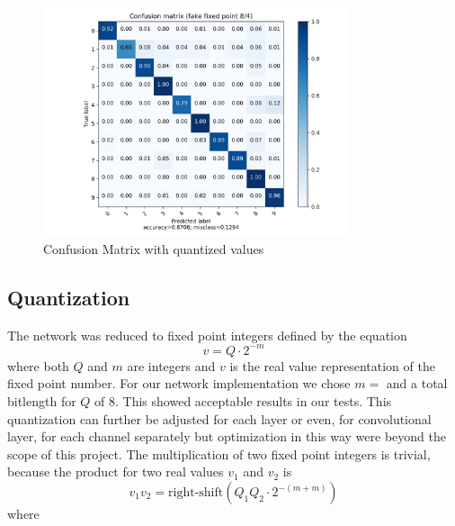 \begin{figure}[htbp]
	\centering
	\includegraphics[width=0.8\textwidth]{../../net/images/qcm}
	\caption{Confusion Matrix with quantized values}
	\label{fig:network-test-qcm}
\end{figure}

\subsection{Quantization}

The network was reduced to fixed point integers defined by the equation
\begin{equation}
	v = Q \cdot 2 ^{-m}
\end{equation}
where both $Q$ and $m$ are integers and $v$ is the real value representation of the fixed point number. 
For our network implementation we chose $m=$ and a total bitlength for $Q$ of $8$. This showed acceptable
results in our tests. This quantization can further be adjusted for each layer or even, for convolutional layer, for each channel
separately but optimization in this way were beyond the scope of this project.
The multiplication of two fixed point integers is trivial, because the product for two real values $v_1$ and $v_2$ is 
\begin{equation}
	v_1 v_2 = \text{right-shift}\left( Q_1 Q_2 \cdot 2^{-(m+m)} \right)
\end{equation}
where 



